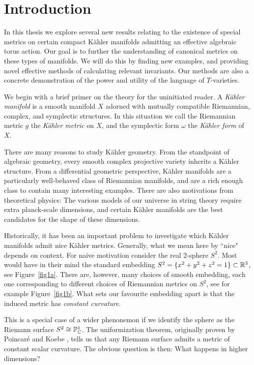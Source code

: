 \chapter{Introduction}


In this thesis we explore several new results relating to the existence of special metrics on certain compact K\"ahler manifolds admitting an effective algebraic torus action. Our goal is to further the understanding of canonical metrics on these types of manifolds. We will do this by finding new examples, and providing novel effective methods of calculating relevant invariants. Our methods are also a concrete demonstration of the power and utility of the language of $T$-varieties.

We begin with a brief primer on the theory for the uninitiated reader. A \textit{K\"ahler manifold} is a smooth manifold \(X\) adorned with mutually compatible Riemannian, complex, and symplectic structures. In this situation we call the Riemannian metric \(g\) the \textit{K\"ahler metric} on \(X\), and the symplectic form \(\omega\) the \textit{K\"ahler form} of \(X\).

There are many reasons to study K\"ahler geometry. From the standpoint of algebraic geometry, every smooth complex projective variety inherits a K\"ahler structure. From a differential geometric perspective, K\"ahler manifolds are a particularly well-behaved class of Riemannian manifolds, and are a rich enough class to contain many interesting examples. There are also motivations from theoretical physics: The various models of our universe in string theory require extra planck-scale dimensions, and certain K\"ahler manifolds are the best candidates for the shape of these dimensions.

Historically, it has been an important problem to investigate which K\"ahler manifolds admit nice K\"ahler metrics. Generally, what we mean here by ``nice" depends on context. For naive motivation consider the real 2-sphere \(S^2\). Most would have in their mind the standard embedding \(S^2 = \{ x^2+y^2+z^2 = 1 \} \subset \mathbb{R}^3\), see Figure~\ref{fig1a}. There are, however, many choices of smooth embedding, each one corresponding to different choices of Riemannian metrics on \(S^2\), see for example Figure~\ref{fig1b}. What sets our favourite embedding apart is that the induced metric has \textit{constant curvature}.

This is a special case of a wider phenonemon if we identify the sphere as the Riemann surface \(S^2 \cong \mathbb{P}_{\mathbb{C}}^1\). The uniformization theorem, originally proven by Poincar\'e \cite{poincare1908uniformisation} and Koebe \cite{koebe1909uniformisierung, koebe1910uniformisierung}, tells us that any Riemann surface admits a metric of constant scalar curvature. The obvious question is then: What happens in higher dimensions?

